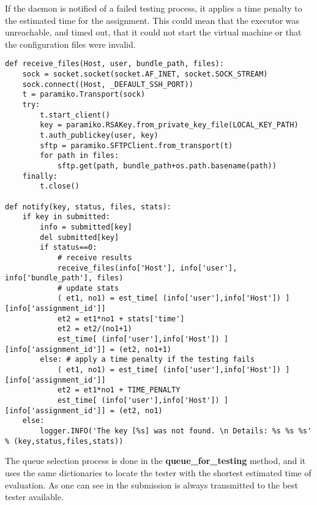 If the daemon is notified of a failed testing process, it applies a time
penalty to the estimated time for the assignment. This could mean that 
the executor was unreachable, and timed out, that it could not start
the virtual machine or that the configuration files were invalid.

\lstset{caption=Notification process, language=python, label=lst:daemon-notify}
\begin{lstlisting}
def receive_files(Host, user, bundle_path, files):
    sock = socket.socket(socket.AF_INET, socket.SOCK_STREAM)
    sock.connect((Host, _DEFAULT_SSH_PORT))
    t = paramiko.Transport(sock)
    try:
        t.start_client()
        key = paramiko.RSAKey.from_private_key_file(LOCAL_KEY_PATH)
        t.auth_publickey(user, key)
        sftp = paramiko.SFTPClient.from_transport(t)
        for path in files:
            sftp.get(path, bundle_path+os.path.basename(path))
    finally:
        t.close()
    
def notify(key, status, files, stats):
    if key in submitted:
        info = submitted[key]
        del submitted[key]
        if status==0:
            # receive results
            receive_files(info['Host'], info['user'], info['bundle_path'], files) 
            # update stats
            ( et1, no1) = est_time[ (info['user'],info['Host']) ][info['assignment_id']]
            et2 = et1*no1 + stats['time']
            et2 = et2/(no1+1)
            est_time[ (info['user'],info['Host']) ][info['assignment_id']] = (et2, no1+1)       
        else: # apply a time penalty if the testing fails
            ( et1, no1) = est_time[ (info['user'],info['Host']) ][info['assignment_id']]
            et2 = et1*no1 + TIME_PENALTY
            est_time[ (info['user'],info['Host']) ][info['assignment_id']] = (et2, no1)
    else:
        logger.INFO('The key [%s] was not found. \n Details: %s %s %s' % (key,status,files,stats))
\end{lstlisting}

The queue selection process is done in the {\bf queue_for_testing} method, and it uses
the same dictionaries to locate the tester with the shortest estimated time
of evaluation. As one can see in  
the submission is always transmitted to the best tester available.

\begin{center}
\end{center}

